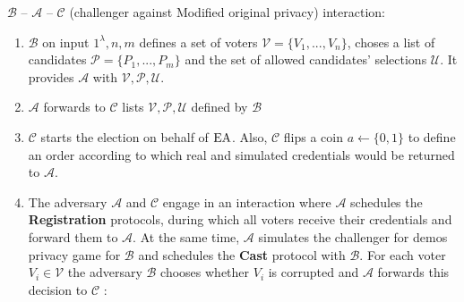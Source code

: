 $\mathcal{B}$ -- $\mathcal{A}$ -- $\mathcal{C}$ (challenger against Modified original privacy) interaction: 
\begin{enumerate}
\item $\mathcal{B}$ on input $1^{\lambda},n,m$ defines a set of voters  $\mathcal{V} = \{V_1,...,V_n\}$, choses a list of candidates  $\mathcal{P} = \{P_1,...,P_m\}$ and the set of allowed candidates' selections $\mathcal{U}$.  It provides $\mathcal{A}$ with $\mathcal{V}, \mathcal{P}, \mathcal{U}$.
 \item $\mathcal{A}$ forwards to $\mathcal{C}$  lists $\mathcal{V}, \mathcal{P}, \mathcal{U}$ defined by $\mathcal{B}$
 \item  $\mathcal{C}$ starts the election on behalf of $\operatorname{EA}$. Also, $\mathcal{C}$ flips a coin $a \leftarrow \{0,1\}$ to define an order according to which real and simulated credentials would be returned to $\mathcal{A}$. 
 \item The adversary $\mathcal{A}$  and $\mathcal{C}$ engage in an interaction where $\mathcal{A}$ schedules the \textbf{Registration} protocols, during which all voters receive their credentials and forward them to $\mathcal{A}$. At the same time, $\mathcal{A}$ simulates the challenger for demos privacy game for $\mathcal{B}$ and schedules the  \textbf{Cast}  protocol with $\mathcal{B}$. For each voter  $V_i \in \mathcal{V}$ the adversary $\mathcal{B}$  chooses whether $V_i$ is corrupted and $\mathcal{A}$ forwards this decision to $\mathcal{C}$ :
\end{enumerate}
